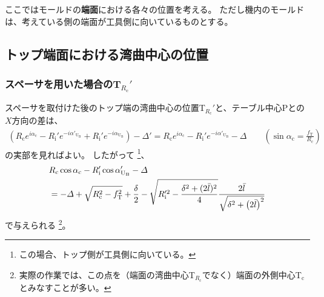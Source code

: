 


ここではモールドの\textbf{端面}における各々の位置を考える。
ただし機内のモールドは、考えている側の端面が工具側に向いているものとする。





\subsection{トップ端面における湾曲中心の位置}

\subsubsection{スペーサを用いた場合のT\texorpdfstring{$_{R_\mathrm c}'$}{Rc'}}
スペーサを取付けた後のトップ端の湾曲中心の位置T$_{R_\mathrm c}'$と、テーブル中心Pとの$X$方向の差は、
\begin{align*}
  \left(
    R_\mathrm ce^{i\alpha_\mathrm c}
    -R_\mathrm i'e^{-i\alpha'_{\mathrm U_\mathrm B}}
    +R_\mathrm i'e^{-i\alpha_{\mathrm U_\mathrm B}}
  \right)
  -\varDelta'
  = R_\mathrm ce^{i\alpha_\mathrm c}-R_\mathrm i'e^{-i\alpha'_{\mathrm U_\mathrm B}}-\varDelta \qquad
    \left(\sin\alpha_\mathrm c = \frac{f_\mathrm T}{R_\mathrm c}\right)
\end{align*}
の実部を見ればよい。
したがって
\footnote{この場合、トップ側が工具側に向いている。}、
\begin{align}
  \notag
  &  R_\mathrm c\cos\alpha_\mathrm c-R_\mathrm i'\cos\alpha'_{\mathrm U_\mathrm B}-\varDelta\\
  &= -\varDelta+\sqrt{R_\mathrm c^2-f_\mathrm T^2}+\frac\delta2
     -\sqrt{R_\mathrm i'^2-\frac{\delta^2+(2\bar l)^2}4}
      \frac{2\bar l}{\sqrt{\delta^2+\left(2\bar l\right)^2}}
     \label{eq:spacerTRc}
\end{align}
で与えられる
\footnote{実際の作業では、この点を（端面の湾曲中心T$_{R_\mathrm c}\!$でなく）端面の外側中心T$_\mathrm c$とみなすことが多い。}。


